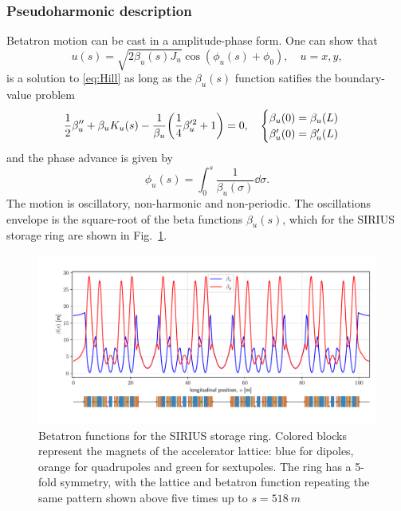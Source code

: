 \subsubsection{Pseudoharmonic description}
Betatron motion can be cast in a amplitude-phase form. One can show that
\begin{equation}
    u(s) = \sqrt{2\beta_u(s) J_u}\cos(\phi_u(s) + \phi_0),\quad u=x,y,
    \label{eq:pseudo_harmon}
\end{equation}
is a solution to \eqref{eq:Hill} as long as the $\beta_u(s)$ function satifies the boundary-value problem
\begin{equation}
    \frac{1}{2}\beta_{u}^{\prime\prime}+\beta_{u} K_u(s) - \frac{1}{\beta_{u}}\qty(\frac{1}{4}\beta_{u}^{\prime 2} + 1 ) = 0, \quad
        \begin{cases}
            \beta_{u}(0) = \beta_{u}(L)\\ \beta_{u}^{\prime}(0) = \beta_{u}^{\prime}(L)
        \end{cases}
    \label{eq:beta_eq}
\end{equation}
and the phase advance is given by
    \begin{equation}
        \phi_u(s) = \int_{0}^{s}\frac{1}{\beta_u(\sigma)}\dd\sigma.
   \end{equation}
The motion is oscillatory, non-harmonic and non-periodic. The oscillations envelope is the square-root of the beta functions $\beta_u(s)$, which for the SIRIUS storage ring are shown in Fig.~\ref{betafunc}.
\begin{figure}[htb]
    \centering
    \includegraphics[width=\textwidth]{Images/beta_functions.pdf}
    \caption{Betatron functions for the SIRIUS storage ring. Colored blocks represent the magnets of the accelerator lattice: blue for dipoles, orange for quadrupoles and green for sextupoles. The ring has a 5-fold symmetry, with the lattice and betatron function repeating the same pattern shown above five times up to $s=518~\unit{m}$}
    \label{betafunc}
\end{figure}
